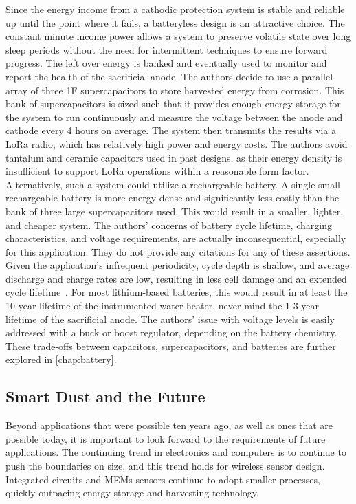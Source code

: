 Since the energy income from a cathodic protection system is stable and reliable up until the point where it fails, a batteryless design is an attractive choice.
The constant minute income power allows a system to preserve volatile state over long sleep periods without the need for intermittent techniques to ensure forward progress.
The left over energy is banked and eventually used to monitor and report the health of the sacrificial anode.
The authors decide to use a parallel array of three 1\si{\farad} supercapacitors to store harvested energy from corrosion.
This bank of supercapacitors is sized such that it provides enough energy storage for the system to run continuously and measure the voltage between the anode and cathode every 4 hours on average.
The system then transmits the results via a LoRa radio, which has relatively high power and energy costs.
The authors avoid tantalum and ceramic capacitors used in past designs, as their energy density is insufficient to support LoRa operations within a reasonable form factor.
Alternatively, such a system could utilize a rechargeable battery. 
A single small rechargeable battery is more energy dense and significantly less costly than the bank of three large supercapacitors used.
This would result in a smaller, lighter, and cheaper system.
The authors' concerns of battery cycle lifetime, charging characteristics, and voltage requirements, are actually inconsequential, especially for this application.
They do not provide any citations for any of these assertions.
Given the application's infrequent periodicity, cycle depth is shallow, and average discharge and charge rates are low, resulting in less cell damage and an extended cycle lifetime~\cite{omarLithium14,wangCycle11}.
For most lithium-based batteries, this would result in at least the 10 year lifetime of the instrumented water heater, never mind the 1-3 year lifetime of the sacrificial anode.
The authors' issue with voltage levels is easily addressed with a buck or boost regulator, depending on the battery chemistry. 
These trade-offs between capacitors, supercapacitors, and batteries are further explored in \cref{chap:battery}.

\subsection{Smart Dust and the Future}
Beyond applications that were possible ten years ago, as well as ones that are possible today, it is important to look forward to the requirements of future applications.
The continuing trend in electronics and computers is to continue to push the boundaries on size, and this trend holds for wireless sensor design.
Integrated circuits and MEMs sensors continue to adopt smaller processes, quickly outpacing energy storage and harvesting technology.



